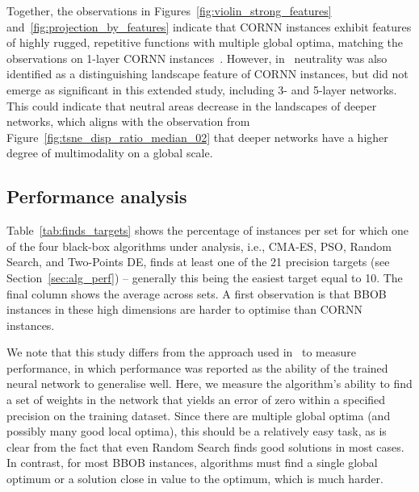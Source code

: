 \documentclass[acmsmall,screen,review,anonymous]{acmart}
\begin{document}

Together, the observations in Figures~\ref{fig:violin_strong_features} and~\ref{fig:projection_by_features} indicate that CORNN instances exhibit features of highly rugged, repetitive functions with multiple global optima, matching the observations on 1-layer CORNN instances~\cite{Malan2025}. However, in~\cite{Malan2025} neutrality was also identified as a distinguishing landscape feature of CORNN instances, but did not emerge as significant in this extended study, including 3- and 5-layer networks. This could indicate that neutral areas decrease in the landscapes of deeper networks, which aligns with the observation from Figure~\ref{fig:tsne_disp_ratio_median_02} that deeper networks have a higher degree of multimodality on a global scale. %

\subsection{Performance analysis}
Table~\ref{tab:finds_targets} shows the percentage of instances per set for which one of the four black-box algorithms under analysis, i.e., CMA-ES, PSO, Random Search, and Two-Points DE, finds at least one of the 21 precision targets (see Section~\ref{sec:alg_perf}) -- generally this being the easiest target equal to 10. The final column shows the average across sets.  A first observation is that BBOB instances in these high dimensions are harder to optimise than CORNN instances. 

We note that this study differs from the approach used in~\cite{Malan2022} to measure performance, in which performance was reported as the ability of the trained neural network to generalise well. Here, we measure the algorithm's ability to find a set of weights in the network that yields an error of zero within a specified precision on the training dataset. Since there are multiple global optima (and possibly many good local optima), this should be a relatively easy task, as is clear from the fact that even Random Search finds good solutions in most cases. In contrast, for most BBOB instances, algorithms must find a single global optimum or a solution close in value to the optimum, which is much harder.
\end{document}
